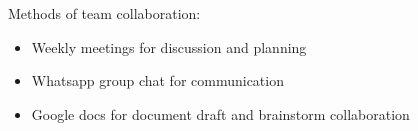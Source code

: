 Methods of team collaboration:
\begin{itemize}
\item Weekly meetings for discussion and planning
\item Whatsapp group chat for communication
\item Google docs for document draft and brainstorm collaboration
\end{itemize}